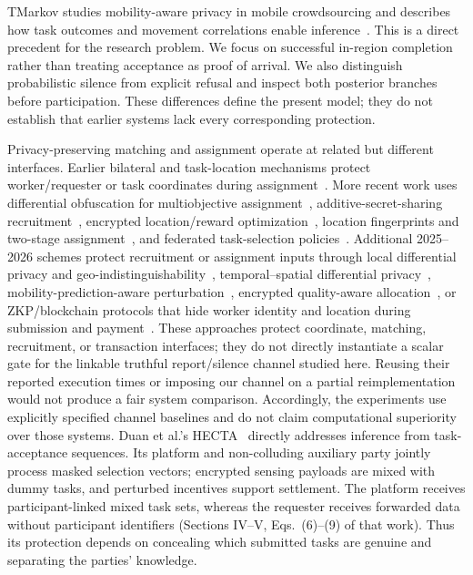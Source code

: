\documentclass[review,12pt]{elsarticle}
\begin{document}
TMarkov studies mobility-aware privacy in mobile crowdsourcing and describes how task outcomes and movement correlations enable inference~\cite{tmarkov}. This is a direct precedent for the research problem. We focus on successful in-region completion rather than treating acceptance as proof of arrival. We also distinguish probabilistic silence from explicit refusal and inspect both posterior branches before participation. These differences define the present model; they do not establish that earlier systems lack every corresponding protection.

Privacy-preserving matching and assignment operate at related but different interfaces. Earlier bilateral and task-location mechanisms protect worker/requester or task coordinates during assignment~\cite{itam2021,taskloc2022}. More recent work uses differential obfuscation for multiobjective assignment~\cite{pmta2024}, additive-secret-sharing recruitment~\cite{ppur2024}, encrypted location/reward optimization~\cite{lrppsta2025}, location fingerprints and two-stage assignment~\cite{fingerprint}, and federated task-selection policies~\cite{fedsense2025}. Additional 2025--2026 schemes protect recruitment or assignment inputs through local differential privacy and geo-indistinguishability~\cite{mtadprh2025}, temporal--spatial differential privacy~\cite{tasp2025}, mobility-prediction-aware perturbation~\cite{p2taskmp2025}, encrypted quality-aware allocation~\cite{qpta2024}, or ZKP/blockchain protocols that hide worker identity and location during submission and payment~\cite{blockchainpmc2026}. These approaches protect coordinate, matching, recruitment, or transaction interfaces; they do not directly instantiate a scalar gate for the linkable truthful report/silence channel studied here. Reusing their reported execution times or imposing our channel on a partial reimplementation would not produce a fair system comparison. Accordingly, the experiments use explicitly specified channel baselines and do not claim computational superiority over those systems. Duan et al.'s HECTA~\cite{inference2026} directly addresses inference from task-acceptance sequences. Its platform and non-colluding auxiliary party jointly process masked selection vectors; encrypted sensing payloads are mixed with dummy tasks, and perturbed incentives support settlement. The platform receives participant-linked mixed task sets, whereas the requester receives forwarded data without participant identifiers (Sections IV--V, Eqs.~(6)--(9) of that work). Thus its protection depends on concealing which submitted tasks are genuine and separating the parties' knowledge.
\end{document}
